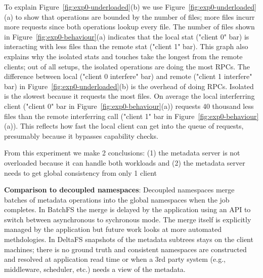 To explain Figure~\ref{fig:exp0-underloaded}(b) we use
Figure~\ref{fig:exp0-underloaded}(a) to show that operations are bounded by the
number of files; more files incurr more requests since both operations lookup
every file. The number of files shown in Figure~\ref{fig:exp0-behaviour}(a)
indicates that the local stat ("client 0" bar) is interacting with less files
than the remote stat ("client 1" bar). This graph also explains why the
isolated stats and touches take the longest from the remote clients; out of all
setups, the isolated operations are doing the most RPCs.  The difference
between local ("client 0 interfere" bar) and remote ("client 1 interfere" bar)
in Figure~\ref{fig:exp0-underloaded}(b) is the overhead of doing RPCs.
Isolated is the slowest because it requests the most files. On average the
local interferring client ("client 0" bar in
Figure~\ref{fig:exp0-behaviour}(a)) requests 40 thousand less files than the
remote interferring call ("client 1" bar in
Figure~\ref{fig:exp0-behaviour}(a)). This reflects how fast the local client
can get into the queue of requests, presumably because it bypasses capability
checks.

From this experiment we make 2 conclusions: (1) the metadata server is not
overloaded because it can handle both workloads and (2) the metadata server
needs to get global consistency from only 1 client

\textbf{Comparison to decoupled namespaces}: Decoupled namespaces merge batches
of metadata operations into the global namespaces when the job completes.  In
BatchFS the merge is delayed by the application using an API to switch between
asynchronous to sychronous mode. The merge itself is explicitly managed by the
application but future work looks at more automated methdologies. In DeltaFS
snapshots of the metadata subtrees stays on the client machines; there is no
ground truth and consistent namespaces are constructed and resolved at
application read time or when a 3rd party system (e.g., middleware, scheduler,
etc.) needs a view of the metadata.


